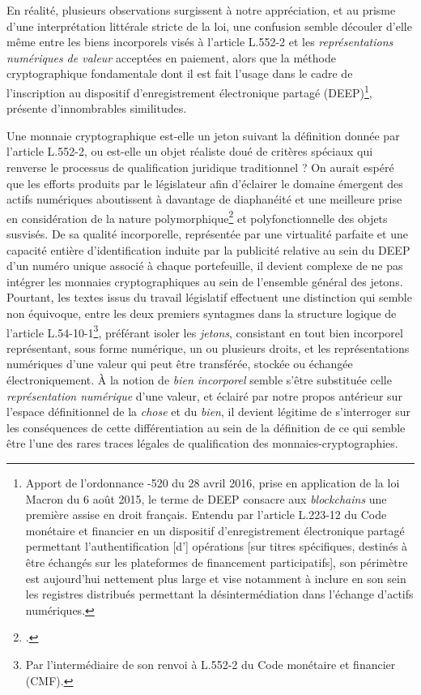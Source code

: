 {En réalité, plusieurs observations surgissent à notre appréciation, et au prisme d'une interprétation littérale stricte de la loi, une confusion semble découler d'elle même entre les biens incorporels visés à l'article L.552-2 et les \emph{représentations numériques de valeur} acceptées en paiement, alors que la méthode cryptographique fondamentale dont il est fait l'usage dans le cadre de l'inscription au dispositif d'enregistrement électronique partagé (DEEP)\footnote{Apport de l'ordonnance -520 du 28 avril 2016, prise en application de la loi Macron du 6 août 2015, le terme de \og DEEP \fg{} consacre aux \emph{blockchains} une première assise en droit français. Entendu par l'article L.223-12 du Code monétaire et financier en un \og dispositif d'enregistrement électronique partagé permettant l'authentification [d'] opérations [sur titres spécifiques, destinés à être échangés sur les plateformes de financement participatifs]\fg{}, son périmètre est aujourd'hui nettement plus large et vise notamment à inclure en son sein les registres distribués permettant la désintermédiation dans l'échange d'actifs numériques.}, présente d'innombrables similitudes.\par

Une monnaie cryptographique est-elle un jeton suivant la définition donnée par  l'article L.552-2, ou est-elle un objet réaliste doué de critères spéciaux qui renverse le processus de qualification juridique traditionnel ? On aurait espéré que les efforts produits par le législateur afin d'éclairer le domaine émergent des actifs numériques aboutissent à davantage de diaphanéité et une meilleure prise en considération de la nature polymorphique\footnote{.} et polyfonctionnelle des objets susvisés. De sa qualité incorporelle, représentée par une virtualité parfaite et une capacité entière d'identification induite par la publicité relative au sein du DEEP d'un numéro unique associé à chaque portefeuille, il devient complexe de ne pas intégrer les monnaies cryptographiques au sein de l'ensemble général des jetons. Pourtant, les textes issus du travail législatif effectuent une distinction qui semble non équivoque, entre les deux premiers syntagmes dans la structure logique de l'article L.54-10-1\footnote{Par l'intermédiaire de son renvoi à L.552-2 du Code monétaire et financier (CMF).}, préférant isoler les \emph{jetons}, consistant en \og tout bien incorporel représentant, sous forme numérique, un ou plusieurs droits\fg{}, et les \og représentations numériques d'une valeur qui peut être transférée, stockée ou échangée électroniquement\fg{}. À la notion de \emph{bien incorporel} semble s'être substituée celle \emph{représentation numérique} d'une valeur, et éclairé par notre propos antérieur sur l'espace définitionnel de la \emph{chose} et du \emph{bien}, il devient légitime de s'interroger sur les conséquences de cette différentiation au sein de la définition de ce qui semble être l'une des rares traces légales de qualification des monnaies-cryptographies.\par

}
